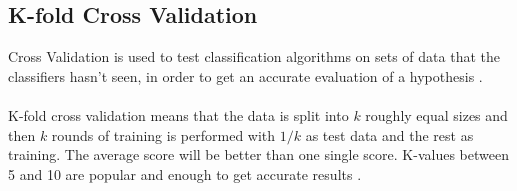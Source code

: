 \subsection{K-fold Cross Validation}
Cross Validation is used to test classification algorithms on sets of data that the classifiers hasn't seen, in order to get an accurate evaluation of a hypothesis \citep{crossvalid_ai}.\\\\
K-fold cross validation means that the data is split into $k$ roughly equal sizes and then $k$ rounds of training is performed with $1/k$ as test data and the rest as training. The average score will be better than one single score. K-values between 5 and 10 are popular and enough to get accurate results \citep{crossvalid_ai}.
